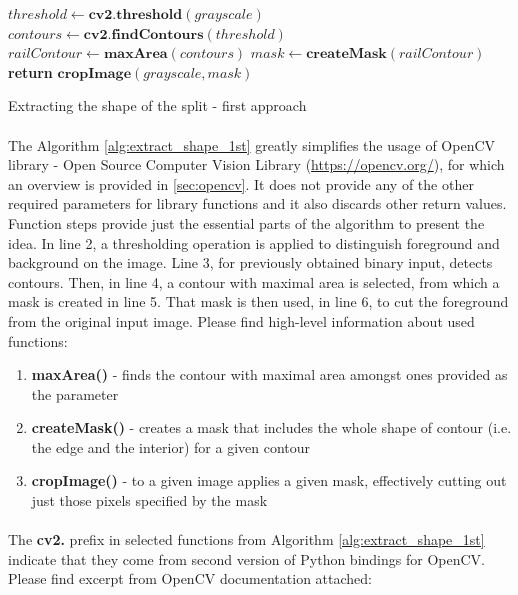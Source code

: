 \begin{algorithm}
	\begin{spacing}{1.5}
	\begin{algorithmic}[1]
			\State $threshold \gets \textbf{cv2.threshold}(grayscale)$
			\State $contours \gets \textbf{cv2.findContours}(threshold)$
			\State $railContour \gets \textbf{maxArea}(contours)$
			\State $mask \gets \textbf{createMask}(railContour)$
			\State \textbf{return} $\textbf{cropImage}(grayscale, mask)$
		\EndFunction
	\end{algorithmic}
	\end{spacing}
	\caption{Extracting the shape of the split - first approach}
	\label{alg:extract_shape_1st}
\end{algorithm}

\paragraph{}
The Algorithm \ref{alg:extract_shape_1st} greatly simplifies the usage of OpenCV library - Open Source Computer Vision Library (\url{https://opencv.org/}), for which an overview is provided in \autoref{sec:opencv}. It does not provide any of the other required parameters for library functions and it also discards other return values. Function steps provide just the essential parts of the algorithm to present the idea. In line 2, a thresholding operation is applied to distinguish foreground and background on the image. Line 3, for previously obtained binary input, detects contours. Then, in line 4, a contour with maximal area is selected, from which a mask is created in line 5. That mask is then used, in line 6, to cut the foreground from the original input image. Please find high-level information about used functions:

\begin{enumerate}
	\item \textbf{maxArea()} - finds the contour with maximal area amongst ones provided as the parameter
	\item \textbf{createMask()} - creates a mask that includes the whole shape of contour (i.e. the edge and the interior) for a given contour
	\item \textbf{cropImage()} - to a given image applies a given mask, effectively cutting out just those pixels specified by the mask 
\end{enumerate}

\paragraph{}
The \textbf{cv2.} prefix in selected functions from Algorithm \ref{alg:extract_shape_1st} indicate that they come from second version of Python bindings for OpenCV. Please find excerpt from OpenCV documentation attached: \cite{opencv-docs}

